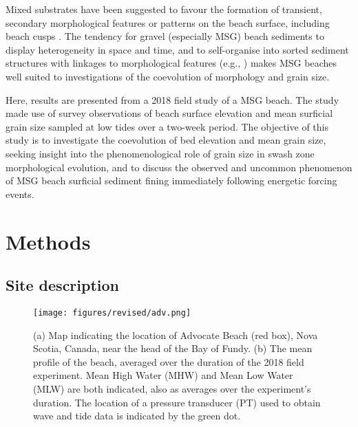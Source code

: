 \documentclass[jmse,article,submit,pdftex,moreauthors]{Definitions/mdpi}
\begin{document}
Mixed substrates have been suggested to favour the formation of transient, secondary morphological features or patterns on the beach surface, including beach cusps \citep{LonguetHiggins_Parkin1962, Guest_Hay2019}. The tendency for gravel (especially MSG) beach sediments to display heterogeneity in space and time, and to self-organise into sorted sediment structures with linkages to morphological features (e.g., \citep{Sherman_etal1993, Austin_Buscombe2008}) makes MSG beaches well suited to investigations of the coevolution of morphology and grain size. 


Here, results are presented from a 2018 field study of a MSG beach. The study made use of survey observations of beach surface elevation and mean surficial grain size sampled at low tides over a two-week period. The objective of this study is to investigate the coevolution of bed elevation and mean grain size, seeking insight into the phenomenological role of grain size in swash zone morphological evolution, and to discuss the observed and uncommon phenomenon of MSG beach surficial sediment fining immediately following energetic forcing events. %




\section{Methods}\label{Methods}

\subsection{Site description}\label{Site}

\begin{figure}[tbp] %
	\texttt{[image: figures/revised/adv.png]}
	\caption{(a) Map indicating the location of Advocate Beach (red box), Nova Scotia, Canada, near the head of the Bay of Fundy. (b) The mean profile of the beach, averaged over the duration of the 2018 field experiment. Mean High Water (MHW) and Mean Low Water (MLW) are both indicated, also as averages over the experiment's duration. The location of a pressure transducer (PT) used to obtain wave and tide data is indicated by the green dot. \label{fig:Adv}}
\end{figure}
\end{document}
